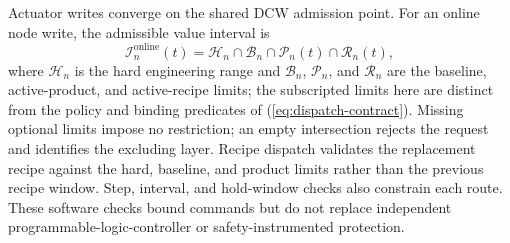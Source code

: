 Actuator writes converge on the shared DCW admission point.
For an online node write, the admissible value interval is
\begin{equation}
\mathcal{I}^{\mathrm{online}}_n(t)=
\mathcal{H}_n\cap\mathcal{B}_n\cap\mathcal{P}_n(t)\cap\mathcal{R}_n(t),
\label{eq:admission}
\end{equation}
where $\mathcal{H}_n$ is the hard engineering range and
$\mathcal{B}_n$, $\mathcal{P}_n$, and $\mathcal{R}_n$ are the baseline,
active-product, and active-recipe limits; the subscripted limits here are
distinct from the policy and binding predicates of
(\ref{eq:dispatch-contract}). Missing optional limits impose no
restriction; an empty intersection rejects the request and identifies the
excluding layer. Recipe dispatch validates the replacement recipe against
the hard, baseline, and product limits rather than the previous recipe
window. Step, interval, and hold-window checks also constrain each route.
These software checks bound commands but do not replace independent
programmable-logic-controller or safety-instrumented protection.


